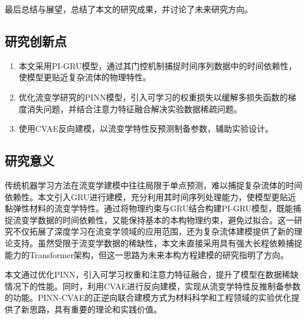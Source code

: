 最后总结与展望，总结了本文的研究成果，并讨论了未来研究方向。
\subsection{研究创新点}
\begin{enumerate}[topsep = 0 pt, itemsep= 0 pt, parsep=0pt, partopsep=0pt, leftmargin=0pt, itemindent=44pt, labelsep=6pt, label=(\arabic*)]
  \item 本文采用PI-GRU模型，通过其门控机制捕捉时间序列数据中的时间依赖性，使模型更贴近复杂流体的物理特性。
  \item 优化流变学研究的PINN模型，引入可学习的权重损失以缓解多损失函数的梯度消失问题，并结合注意力特征融合解决实验数据稀疏问题。
  \item 使用CVAE反向建模，以流变学特性反预测制备参数，辅助实验设计。
\end{enumerate}
\subsection{研究意义}
传统机器学习方法在流变学建模中往往局限于单点预测，难以捕捉复杂流体的时间依赖性。本文引入GRU进行建模，充分利用其时间序列处理能力，使模型更贴近黏弹性材料的流变学特性。通过将物理约束与GRU结合构建PI-GRU模型，既能捕捉流变学数据的时间依赖性，又能保持基本的本构物理约束，避免过拟合。这一研究不仅拓展了深度学习在流变学领域的应用范围，还为复杂流体建模提供了新的理论支持。虽然受限于流变学数据的稀缺性，本文未直接采用具有强大长程依赖捕捉能力的Transformer架构，但这一思路为未来本构方程建模的研究指明了方向。

本文通过优化PINN，引入可学习权重和注意力特征融合，提升了模型在数据稀缺情况下的性能。同时，利用CVAE进行反向建模，实现从流变学特性反推制备参数的功能。PINN-CVAE的正逆向联合建模方式为材料科学和工程领域的实验优化提供了新思路，具有重要的理论和实践价值。